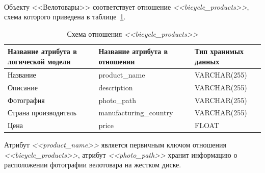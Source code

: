 \paragraph{}
Объекту <<Велотовары>> соответствует отношение \textit{<<bicycle\_products>>}, схема которого приведена в
таблице~\ref{tbl:bicycle_products_scheme}.
\begin{table}[h!]
  \caption{Схема отношения \textit{<<bicycle\_products>>}}
  \label{tbl:bicycle_products_scheme}
  \small{
    \centering
    \begin{tabular}{| p{} | p{} | p{} |}
      \hline
      Название атрибута в \newline логической модели &
      Название атрибута в \newline отношении &
      Тип хранимых данных \\

      \hline
      Название & product\_name & VARCHAR(255) \\

      \hline
      Описание & description & VARCHAR(255) \\

      \hline
      Фотография & photo\_path & VARCHAR(255) \\

      \hline
      Страна производитель & manufacturing\_country & VARCHAR(255) \\

      \hline
      Цена & price & FLOAT \\

      \hline
    \end{tabular}
  }
\end{table}

Атрибут \textit{<<product\_name>>} является первичным ключом отношения \textit{<<bicycle\_products>>},
атрибут \textit{<<photo\_path>>} хранит информацию о расположении фотографии велотовара
на жестком диске. 

